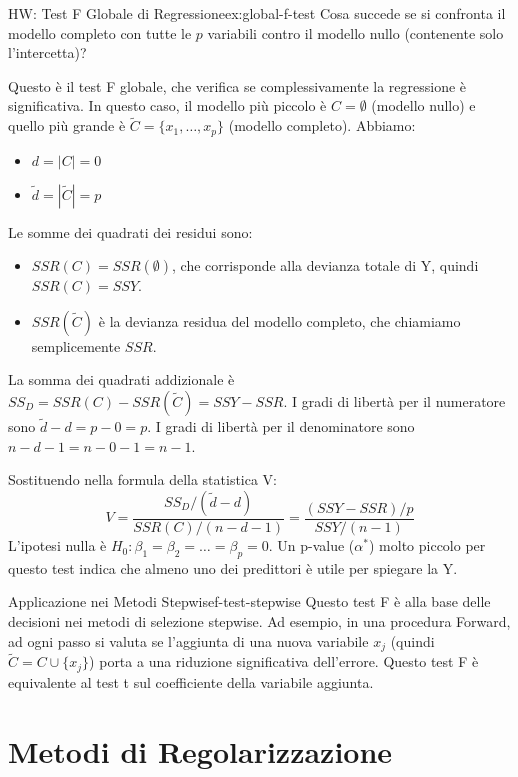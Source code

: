 \begin{esercizio}{HW: Test F Globale di Regressione}{ex:global-f-test}
Cosa succede se si confronta il modello completo con tutte le \(p\) variabili
contro il modello nullo (contenente solo l'intercetta)?
\begin{dimostrazione}{}{}
Questo è il test F globale, che verifica se complessivamente la regressione è
significativa. In questo caso, il modello più piccolo è \(C=\emptyset\)
(modello nullo) e quello più grande è \(\tilde{C}=\{x_1, \dots, x_p\}\)
(modello completo).
Abbiamo:
\begin{itemize}
    \item \(d = |C| = 0\)
    \item \(\tilde{d} = |\tilde{C}| = p\)
\end{itemize}
Le somme dei quadrati dei residui sono:
\begin{itemize}
    \item \(SSR(C) = SSR(\emptyset)\), che corrisponde alla devianza totale di
    Y, quindi \(SSR(C)=SSY\).
    \item \(SSR(\tilde{C})\) è la devianza residua del modello completo, che
    chiamiamo semplicemente \(SSR\).
\end{itemize}
La somma dei quadrati addizionale è \(SS_D = SSR(C) - SSR(\tilde{C}) = SSY -
SSR\).
I gradi di libertà per il numeratore sono \(\tilde{d}-d = p-0=p\).
I gradi di libertà per il denominatore sono \(n-d-1 = n-0-1=n-1\).

Sostituendo nella formula della statistica V:
\[ V = \frac{SS_D/(\tilde{d}-d)}{SSR(C)/(n-d-1)} = \frac{(SSY-SSR)/p}{SSY/(n-1)}
\]
L'ipotesi nulla è \(H_0: \beta_1 = \beta_2 = \dots = \beta_p = 0\). Un p-value
(\(\alpha^*\)) molto piccolo per questo test indica che almeno uno dei
predittori è utile per spiegare la Y.
\end{dimostrazione}
\end{esercizio}

\begin{nota}{Applicazione nei Metodi Stepwise}{f-test-stepwise}
Questo test F è alla base delle decisioni nei metodi di selezione stepwise. Ad
esempio, in una procedura Forward, ad ogni passo si valuta se l'aggiunta di una
nuova variabile \(x_j\) (quindi \(\tilde{C} = C \cup \{x_j\}\)) porta a una
riduzione significativa dell'errore. Questo test F è equivalente al test t sul
coefficiente della variabile aggiunta.
\end{nota}


\section{Metodi di Regolarizzazione}

